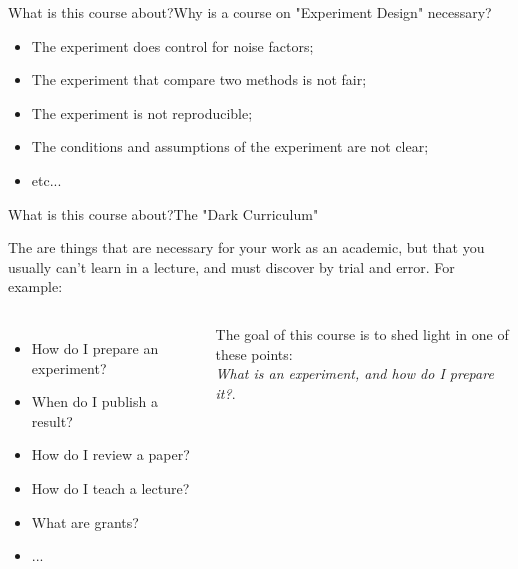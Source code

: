 \documentclass[aspectratio=169]{beamer}
\begin{document}
\begin{CJK}{UTF8}{ipxm}
\begin{frame}{What is this course about?}{Why is a course on "Experiment Design" necessary?}
  \begin{itemize}
    \item The experiment does control for noise factors;\\
    \item The experiment that compare two methods is not fair;\\
    \item The experiment is not reproducible;\\
    \item The conditions and assumptions of the experiment are not clear;\\
    \item etc...
  \end{itemize}
\end{frame}

\begin{frame}{What is this course about?}{The "Dark Curriculum"}

  The  are things that are necessary for your work as an academic, but that you usually can't learn in a lecture, and must discover by \alert{trial and error}. For example:\bigskip

  \begin{columns}
    \begin{itemize}
      \item How do I prepare an experiment?
      \item When do I publish a result?
      \item How do I review a paper?
      \item How do I teach a lecture?
      \item What are grants?
      \item ...
    \end{itemize}\bigskip

    The goal of this course is to shed light in one of these points:\\
    \emph{What is an experiment, and how do I prepare it?}.\bigskip


\end{columns}
\end{frame}
\end{CJK}
\end{document}
